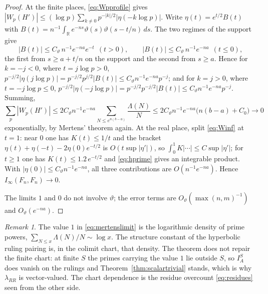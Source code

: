 \documentclass[11pt]{amsart}
\theoremstyle{definition}
\theoremstyle{remark}
\newtheorem{remark}[theorem]{Remark}
\newcommand{\R}{\mathbb R}
\begin{document}
\begin{proof}
At the finite places, \eqref{eq:Wpprofile} gives
$|W_p(H')|\le(\log p)\sum_{k\ne0}p^{-|k|/2}|\eta(-k\log p)|$.  Write
$\eta(t)=e^{t/2}B(t)$ with
$B(t)=n^{-1}\int_{\R}e^{-ns}\vartheta(s)\vartheta(s-t/n)\,ds$.  The two regimes of the
support give
\[
|B(t)|\le C_{\vartheta}\,n^{-1}e^{-na}e^{-t}\ \ (t>0),\qquad
|B(t)|\le C_{\vartheta}\,n^{-1}e^{-na}\ \ (t\le0),
\]
the first from $s\ge a+t/n$ on the support and the second from $s\ge a$.
Hence for $k=-j<0$, where $t=j\log p>0$,
$p^{-j/2}|\eta(j\log p)|=p^{-j/2}p^{j/2}|B(t)|\le
C_{\vartheta}n^{-1}e^{-na}p^{-j}$; and for $k=j>0$, where $t=-j\log p\le0$,
$p^{-j/2}|\eta(-j\log p)|=p^{-j/2}p^{-j/2}|B(t)|\le
C_{\vartheta}n^{-1}e^{-na}p^{-j}$.  Summing,
\[
\sum_p|W_p(H')|\le 2C_{\vartheta}n^{-1}e^{-na}
\sum_{N\le e^{n(b-a)}}\frac{\Lambda(N)}{N}
\le 2C_{\vartheta}n^{-1}e^{-na}\bigl(n(b-a)+C_0\bigr)\longrightarrow0
\]
exponentially, by Mertens' theorem again.  At the real place, split
\eqref{eq:Winf} at $t=1$: near $0$ one has $K(t)\le1/t$ and the bracket
$\eta(t)+\eta(-t)-2\eta(0)e^{-t/2}$ is $O(t\sup|\eta'|)$, so
$\int_0^{1}K|\cdots|\le C\sup|\eta'|$; for $t\ge1$ one has
$K(t)\le1.2\,e^{-t/2}$ and \eqref{eq:hprime} gives an integrable product.
With $|\eta(0)|\le C_{\vartheta}n^{-1}e^{-na}$, all
three contributions are $O(n^{-1}e^{-na})$.  Hence $I_{\infty}(F_n,F_n)\to0$.

The limits $1$ and $0$ do not involve $\vartheta$; the error terms are
$O_{\vartheta}(\max(n,m)^{-1})$ and $O_{\vartheta}(e^{-na})$.
\end{proof}

\begin{remark}\label{rem:mertensmeaning}
The value $1$ in \eqref{eq:mertenslimit} is the logarithmic density of prime
powers, $\sum_{N\le x}\Lambda(N)/N\sim\log x$.  The structure constant of the
hyperbolic ruling pairing is, in the colimit chart, that density.  The theorem
does not repair the finite chart: at finite $S$ the primes carrying the value
$1$ lie outside $S$, so $I_A^{S}$ does vanish on the rulings and
Theorem~\ref{thm:scalartrivial} stands, which is why $\lambda_{RR}$ is
vector-valued.  The chart dependence is the residue overcount
\eqref{eq:residues} seen from the other side.
\end{remark}
\end{document}
